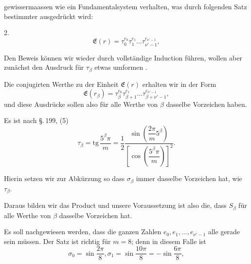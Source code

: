 gewissermaassen wie ein Fundamentalsystem verhalten, was durch
folgenden Satz bestimmter ausgedrückt wird:

2. 
\[
\mathfrak{E}(r) = \tau_0^{e_0}\tau_1^{e_1}\ldots\tau_{\nu'-1}^{e_{\nu'-1}},
\]

Den Beweis können wir wieder durch vollständige Induction
führen, wollen aber zunächst den Ausdruck für $\tau_\beta$ etwas umformen
.

Die conjugirten Werthe zu der Einheit $\mathfrak{E}(r)$ erhalten wir
in der Form
\[
\mathfrak{E}(r_\beta) = \tau_\beta^{e_0}\tau_{\beta+1}^{e_1}\ldots\tau_{\beta+\nu'-1}^{e_{\nu'-1}},
\]
und diese Ausdrücke sollen also für alle Werthe von $\beta$ dasselbe
Vorzeichen haben.

Es ist nach §.\,199, (5)
\[
\tau_\beta = \mathrm{tg}\,\frac{5^\beta\pi}{m} = \frac{1}{2}\frac{\sin\left(\dfrac{2\pi}{m}5^\beta\right)}{\left[\cos\left(\dfrac{5^\beta\pi}{m}\right)\right]^2}.
\]

Hierin setzen wir zur Abkürzung
so dass $\sigma_\beta$ immer dasselbe Vorzeichen hat, wie $\tau_\beta$.

Daraus bilden wir das Product
und unsere Voraussetzung ist also die, dass $S_\beta$ für alle Werthe
von $\beta$ dasselbe Vorzeichen hat.

Es soll nachgewiesen werden, dass die ganzen Zahlen
$e_0, e_1, \ldots, e_{\nu'-1}$ alle gerade sein müssen. Der Satz ist
richtig für $m=8$; denn in diesem Falle ist
\[
\sigma_0 = \sin\frac{2\pi}{8}, \sigma_1 = \sin\frac{10\pi}{8} = -\sin\frac{6\pi}{8},
\]
